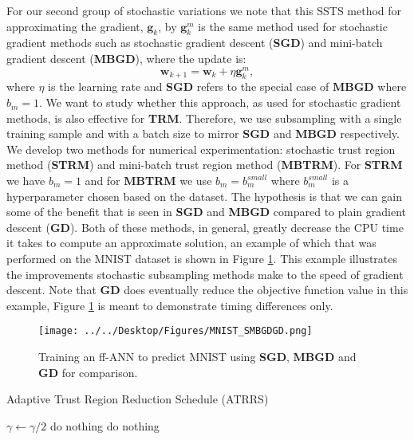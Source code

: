\documentclass[letterpaper,12pt,titlepage,oneside,final]{book}
\begin{document}
	For our second group of stochastic variations we note that this SSTS method for approximating the gradient, $\mathbf{g}_{k}$, by $\mathbf{g}_{k}^{m}$ is the same method used for stochastic gradient methods such as stochastic gradient descent (\textbf{SGD}) and mini-batch gradient descent (\textbf{MBGD}), where the update is:
	\begin{equation}
	\mathbf{w}_{k+1} = \mathbf{w}_{k} + \eta \mathbf{g}_{k}^{m}, 
	\end{equation}
	where $\eta$ is the learning rate and \textbf{SGD} refers to the special case of $\mathbf{MBGD}$ where $b_{m} = 1$. We want to study whether this approach, as used for stochastic gradient methods, is also effective for \textbf{TRM}. Therefore, we use subsampling with a single training sample and with a batch size to mirror \textbf{SGD} and \textbf{MBGD} respectively. We develop two methods for numerical experimentation: stochastic trust region method (\textbf{STRM}) and mini-batch trust region method (\textbf{MBTRM}). For \textbf{STRM} we have $b_{m} = 1$ and for \textbf{MBTRM} we use $b_{m} = b_{m}^{small}$ where $b_{m}^{small}$ is a hyperparameter chosen based on the dataset. The hypothesis is that we can gain some of the benefit that is seen in \textbf{SGD} and \textbf{MBGD} compared to plain gradient descent (\textbf{GD}). Both of these methods, in general, greatly decrease the CPU time it takes to compute an approximate solution, an example of which that was performed on the MNIST dataset \cite{mnist} is shown in Figure \ref{figure:SMBGDGD}. This example illustrates the improvements stochastic subsampling methods make to the speed of gradient descent. Note that \textbf{GD} does eventually reduce the objective function value in this example, Figure \ref{figure:SMBGDGD} is meant to demonstrate timing differences only.
	
	\begin{figure}[h]
		\centering
		\texttt{[image: ../../Desktop/Figures/MNIST\_SMBGDGD.png]}
		\caption{Training an ff-ANN to predict MNIST using \textbf{SGD}, \textbf{MBGD} and \textbf{GD} for comparison. }
		\label{figure:SMBGDGD}
	\end{figure}
	
	\begin{algorithm}
		\caption{Adaptive Trust Region Reduction Schedule (ATRRS)}
		\begin{algorithmic}[1]
			\State $\gamma \gets \gamma / 2$
			\Else
			\State do nothing
			\EndIf
			\Else
			\State do nothing
			\EndIf
			\EndFunction
		\end{algorithmic}	
		\label{algorithm:assrs-simple}	
	\end{algorithm}
	
\end{document}
